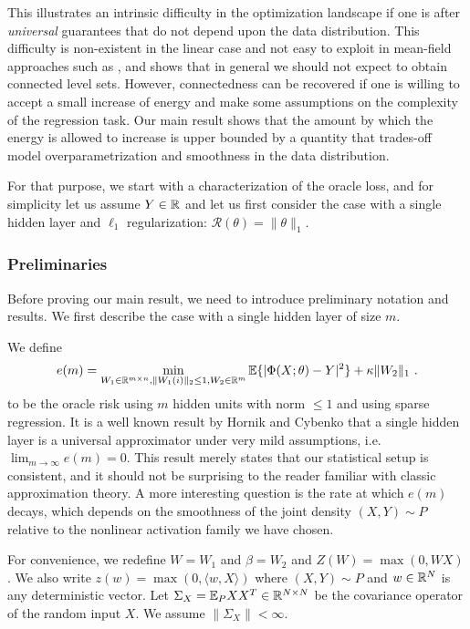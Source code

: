 This illustrates an intrinsic difficulty in the optimization landscape if one is after \emph{universal} 
guarantees that do not depend upon the data distribution. This difficulty is non-existent in the linear case 
and not easy to exploit in mean-field approaches such as \cite{choromanska2015loss}, 
and shows that in general 
we should not expect to obtain connected level sets. However, 
connectedness can be recovered if one is willing to accept a small increase 
of energy and make some assumptions on the complexity of the regression task.
 Our main result shows that the amount by which the energy is 
allowed to increase is upper bounded by a quantity that trades-off model overparametrization 
and smoothness in the data distribution.

For that purpose, we start with a characterization of the oracle loss, and for simplicity let us assume 
$Y \in {\mathbb{R}}$ and let us first consider the case with a single hidden layer and $\ell_1$ regularization:
$\mathcal{R}(\theta) = \| \theta\|_1$.

\subsubsection{Preliminaries}
 Before proving our main result, we need to introduce  preliminary notation and results. 
We first describe the case with a single hidden layer of size $m$. 

We define
\begin{equation}
\label{bla2}
e(m) = \min_{W_1 \in {\mathbb{R}}^{m \times n}, \|W_1(i) \|_2 \leq 1, W_2 \in {\mathbb{R}}^m} {\mathbb{E}}\{ | \Phi(X; \theta) - Y|^2 \} + \kappa  \| W_2 \|_1~.
\end{equation}
to be the oracle risk using $m$ hidden units with norm $\leq 1$ and using sparse regression. 
It is a well known result by Hornik and Cybenko that a single hidden layer 
is a universal approximator under very mild assumptions, i.e. $\lim_{m \to \infty} e(m) = 0$.
This result merely states that our statistical setup is consistent, and it should not be 
surprising to the reader familiar with classic approximation theory.
 A more interesting question is the rate at which $e(m)$ decays, which depends 
on the smoothness of the joint density $(X, Y) \sim P$ relative to the nonlinear activation 
family we have chosen.

For convenience, we redefine $W = W_1$ and $\beta = W_2$ and
 $Z(W) = \max(0, W X)$. We also write $z(w) = \max(0, \langle w, X \rangle)$ where $(X, Y) \sim P$ and $w \in {\mathbb{R}}^N$ is any deterministic vector.
Let $\Sigma_X = {\mathbb{E}}_{P} XX^T \in {\mathbb{R}}^{N \times N}$ be the covariance operator of the random input $X$. We assume $\| \Sigma_X \| < \infty$. 

